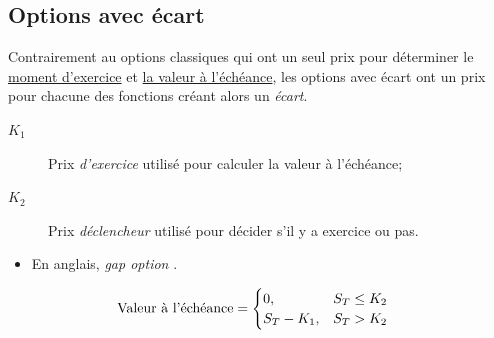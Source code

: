 \documentclass[10pt, french]{article}
\begin{document}
\begin{multicols*}{2}
\columnbreak
\subsection{Options avec écart}
\begin{definitionNOHFILL}
Contrairement au options classiques qui ont un seul prix pour déterminer le \underline{moment d'exercice} et \underline{la valeur à l'échéance}, les options avec écart ont un prix pour chacune des fonctions créant alors un \textit{écart}.

\begin{distributions}[Notation]
\begin{description}
	\item[$K_{1}$]	Prix \textit{d'exercice} utilisé pour calculer la valeur à l'échéance;
	\item[$K_{2}$]	Prix \textit{déclencheur} utilisé pour décider s'il y a exercice ou pas.
\end{description}
\end{distributions}

\tcbline

\begin{itemize}[leftmargin = *]
	\item	En anglais, \og \textit{gap option} \fg{}.
\end{itemize}
\end{definitionNOHFILL}

\begin{definitionNOHFILLsub}
\begin{align*}
	\shortstack{Valeur à l'échéance}
	&=	\begin{cases}
		0,	&	S_{T}	\leq		K_{2}	\\
		S_{T}	-	K_{1},	&	S_{T}	>		K_{2}	\\
		\end{cases}
\end{align*}

\begin{center}	

\end{center}
\end{definitionNOHFILLsub}
\end{multicols*}
\end{document}
